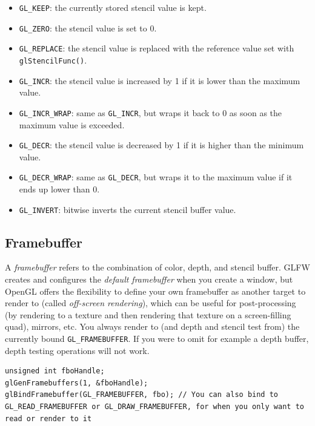\documentclass[table, xcdraw]{article}%
\begin{document}
\begin{itemize}
    \item \texttt{GL_KEEP}: the currently stored stencil value is kept.
    \item \texttt{GL_ZERO}: the stencil value is set to 0.
    \item \texttt{GL_REPLACE}: the stencil value is replaced with the reference value set with \texttt{glStencilFunc()}.
    \item \texttt{GL_INCR}: the stencil value is increased by 1 if it is lower than the maximum value.
    \item \texttt{GL_INCR_WRAP}: same as \texttt{GL_INCR}, but wraps it back to 0 as soon as the maximum value is exceeded.
    \item \texttt{GL_DECR}: the stencil value is decreased by 1 if it is higher than the minimum value.
    \item \texttt{GL_DECR_WRAP}: same as \texttt{GL_DECR}, but wraps it to the maximum value if it ends up lower than 0.
    \item \texttt{GL_INVERT}: bitwise inverts the current stencil buffer value.
\end{itemize}

\subsection{Framebuffer} \label{framebuffer}

A \emph{framebuffer} refers to the combination of color, depth, and stencil buffer. GLFW creates and configures the \emph{default framebuffer} when you create a window, but OpenGL offers the flexibility to define your own framebuffer as another target to render to (called \emph{off-screen rendering}), which can be useful for post-processing (by rendering to a texture and then rendering that texture on a screen-filling quad), mirrors, etc. You always render to (and depth and stencil test from) the currently bound \texttt{GL_FRAMEBUFFER}. If you were to omit for example a depth buffer, depth testing operations will not work.

\begin{verbatim}
unsigned int fboHandle;
glGenFramebuffers(1, &fboHandle);
glBindFramebuffer(GL_FRAMEBUFFER, fbo); // You can also bind to GL_READ_FRAMEBUFFER or GL_DRAW_FRAMEBUFFER, for when you only want to read or render to it
\end{verbatim}
\end{document}
